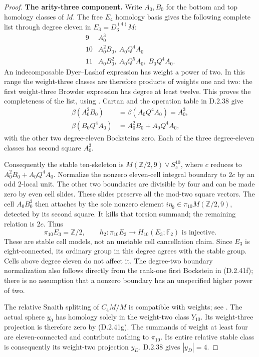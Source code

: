 \begin{proof}
\textbf{The arity-three component.}
Write $A_0,B_0$ for the bottom and top homology classes of $M$.
The free $E_4$ homology basis gives the following complete list
through degree eleven in $E_3=D_3^{(4)}M$:
\[
\begin{array}{c|l}
9&A_0^3\\
10&A_0^2B_0,\ A_0Q^4A_0\\
11&A_0B_0^2,\ A_0Q^5A_0,\ B_0Q^4A_0.
\end{array}
 \tag{D.2.41e}
\]
An indecomposable Dyer--Lashof expression has weight a power
of two. In this range the weight-three classes are therefore
products of weights one and two: the first weight-three
Browder expression has degree at least twelve. This proves
the completeness of the list, using
\cite[Chapter III, Theorems~3.1--3.2]{I_CohenLadaMay1976}.
Cartan and the operation table in D.2.38 give
\[
\begin{split}
 \beta(A_0^2B_0)&=\beta(A_0Q^4A_0)=A_0^3,\\
 \beta(B_0Q^4A_0)&=A_0^2B_0+A_0Q^4A_0,
\end{split}
 \tag{D.2.41f}
\]
with the other two degree-eleven Bocksteins zero. Each of the
three degree-eleven classes has second square $A_0^3$.

Consequently the stable ten-skeleton is
$M(\mathbb Z/2,9)\vee S^{10}_c$, where $c$ reduces to
$A_0^2B_0+A_0Q^4A_0$. Normalize the nonzero eleven-cell
integral boundary to $2c$ by an odd $2$-local unit. The other
two boundaries are divisible by four and can be made zero by
even cell slides. These slides preserve all the mod-two square
vectors. The cell $A_0B_0^2$ then attaches by the sole nonzero
element $i\eta_9\in\pi_{10}M(\mathbb Z/2,9)$, detected by
its second square. It kills that torsion summand; the remaining
relation is $2c$. Thus
\[
 \pi_{10}E_3=\mathbb Z/2,
 \qquad
 h_2:\pi_{10}E_3\longrightarrow H_{10}(E_3;\mathbb F_2)
 \text{ is injective}.
 \tag{D.2.41g}
\]
These are stable cell models, not an unstable cell cancellation
claim. Since $E_3$ is eight-connected, its ordinary group in
this degree agrees with the stable group. Cells above degree
eleven do not affect it. The degree-two boundary normalization
also follows directly from the rank-one first Bockstein in
\textup{(D.2.41f)}; there is no assumption that a nonzero
boundary has an unspecified higher power of two.

The relative Snaith splitting of $C_4M/M$ is compatible with
weights; see \cite[Theorems~1.1 and~3.2]{Snaith1974}.
The actual sphere $y_0$ has homology solely in the weight-two
class $Y_{10}$. Its weight-three projection is therefore zero
by \textup{(D.2.41g)}. The summands of weight at least four
are eleven-connected and contribute nothing to $\pi_{10}$.
Its entire relative stable class is consequently its
weight-two projection $y_D$. D.2.38 gives $|y_D|=4$.


\end{proof}
